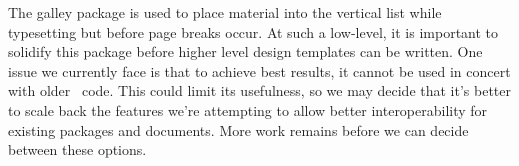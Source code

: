 \documentclass{ltnews}
\begin{document}
The \textsf{galley} package is used to place material into the vertical list while typesetting but before page breaks occur. At such a low-level, it is important to solidify this package before higher level design templates can be written. One issue we currently face is that to achieve best results, it cannot be used in concert with older \LaTeXe\ code. This could limit its usefulness, so we may decide that it's better to scale back the features we're attempting to allow better interoperability for existing packages and documents. More work remains before we can decide between these options.
\end{document}

